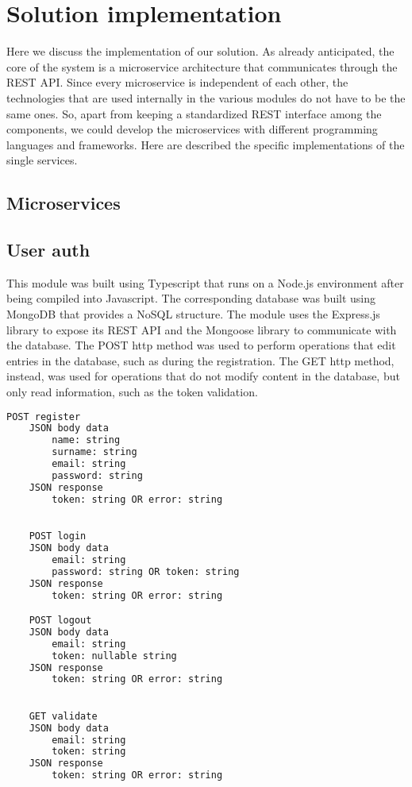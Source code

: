 \section{Solution implementation}
Here we discuss the implementation of our solution. As already anticipated,
the core of the system is a microservice architecture that communicates
through the REST API. Since every microservice is independent of each
other, the technologies that are used internally in the various modules
do not have to be the same ones. So, apart from keeping a standardized REST
interface among the components, we could develop the microservices with
different programming languages and frameworks. Here are described the
specific implementations of the single services.

\subsection{Microservices}


\subsection{User auth}

This module was built using Typescript that runs on a Node.js environment after
being compiled into Javascript. The corresponding database was built using MongoDB
that provides a NoSQL structure. The module uses the Express.js library to expose
its REST API and the Mongoose library to communicate with the database. The POST http
method was used to perform operations that edit entries in the database, such as
during the registration. The GET http method, instead, was used for operations that
do not modify content in the database, but only read information, such as the token
validation.\\


\begin{lstlisting}[language=bash,caption={User auth exposed API}]
    POST register
    JSON body data
        name: string
        surname: string
        email: string
        password: string
    JSON response
        token: string OR error: string

        
    POST login
    JSON body data
        email: string
        password: string OR token: string
    JSON response
        token: string OR error: string

    POST logout
    JSON body data
        email: string
        token: nullable string
    JSON response
        token: string OR error: string

        
    GET validate
    JSON body data
        email: string
        token: string
    JSON response
        token: string OR error: string
\end{lstlisting}



